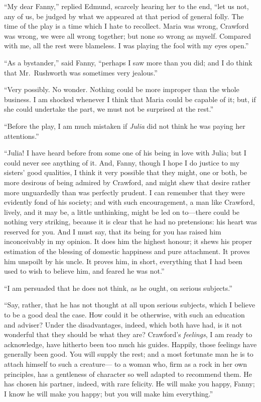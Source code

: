 ``My dear Fanny,'' replied Edmund, scarcely hearing her
to the end, ``let us not, any of us, be judged by what we
appeared at that period of general folly.  The time of the
play is a time which I hate to recollect.  Maria was wrong,
Crawford was wrong, we were all wrong together; but none
so wrong as myself.  Compared with me, all the rest
were blameless.  I was playing the fool with my eyes open.''

``As a bystander,'' said Fanny, ``perhaps I saw more than
you did; and I do think that Mr.\ Rushworth was sometimes
very jealous.''

``Very possibly.  No wonder.  Nothing could be more improper
than the whole business.  I am shocked whenever I think
that Maria could be capable of it; but, if she could
undertake the part, we must not be surprised at the rest.''

``Before the play, I am much mistaken if \emph{Julia} did
not think he was paying her attentions.''

``Julia!  I have heard before from some one of his being
in love with Julia; but I could never see anything of it.
And, Fanny, though I hope I do justice to my sisters'
good qualities, I think it very possible that they might,
one or both, be more desirous of being admired by Crawford,
and might shew that desire rather more unguardedly than was
perfectly prudent.  I can remember that they were evidently
fond of his society; and with such encouragement, a man
like Crawford, lively, and it may be, a little unthinking,
might be led on to---there could be nothing very striking,
because it is clear that he had no pretensions:  his heart
was reserved for you.  And I must say, that its being
for you has raised him inconceivably in my opinion.
It does him the highest honour; it shews his proper estimation
of the blessing of domestic happiness and pure attachment.
It proves him unspoilt by his uncle.  It proves him, in short,
everything that I had been used to wish to believe him,
and feared he was not.''

``I am persuaded that he does not think, as he ought,
on serious subjects.''

``Say, rather, that he has not thought at all upon serious
subjects, which I believe to be a good deal the case.
How could it be otherwise, with such an education and adviser?
Under the disadvantages, indeed, which both have had,
is it not wonderful that they should be what they are?
Crawford's \emph{feelings}, I am ready to acknowledge, have hitherto
been too much his guides.  Happily, those feelings have
generally been good.  You will supply the rest; and a most
fortunate man he is to attach himself to such a creature---%
to a woman who, firm as a rock in her own principles, has a
gentleness of character so well adapted to recommend them.
He has chosen his partner, indeed, with rare felicity.
He will make you happy, Fanny; I know he will make you happy;
but you will make him everything.''

